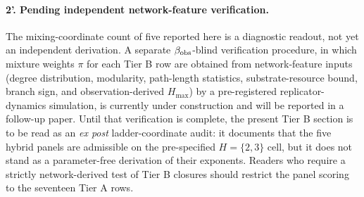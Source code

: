 \paragraph{2'. Pending independent network-feature verification.}
The mixing-coordinate count of five reported here is a diagnostic readout, not yet an independent derivation. A separate \(\beta_{\rm obs}\)-blind verification procedure, in which mixture weights \(\pi\) for each Tier B row are obtained from network-feature inputs (degree distribution, modularity, path-length statistics, substrate-resource bound, branch sign, and observation-derived \(H_{\max}\)) by a pre-registered replicator-dynamics simulation, is currently under construction and will be reported in a follow-up paper. Until that verification is complete, the present Tier B section is to be read as an \emph{ex post} ladder-coordinate audit: it documents that the five hybrid panels are admissible on the pre-specified \(H=\{2,3\}\) cell, but it does not stand as a parameter-free derivation of their exponents. Readers who require a strictly network-derived test of Tier B closures should restrict the panel scoring to the seventeen Tier A rows.

